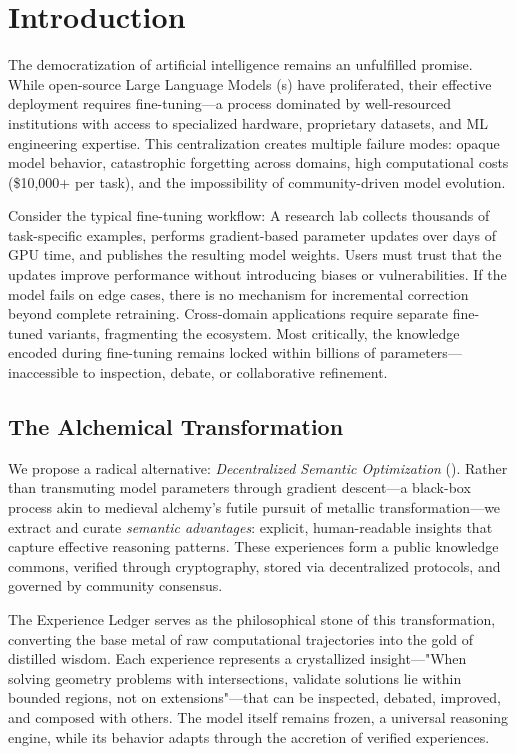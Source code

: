 \section{Introduction}


The democratization of artificial intelligence remains an unfulfilled promise. While open-source Large Language Models (\LLM{}s) have proliferated, their effective deployment requires fine-tuning—a process dominated by well-resourced institutions with access to specialized hardware, proprietary datasets, and ML engineering expertise. This centralization creates multiple failure modes: opaque model behavior, catastrophic forgetting across domains, high computational costs (\$10,000+ per task), and the impossibility of community-driven model evolution.

Consider the typical fine-tuning workflow: A research lab collects thousands of task-specific examples, performs gradient-based parameter updates over days of GPU time, and publishes the resulting model weights. Users must trust that the updates improve performance without introducing biases or vulnerabilities. If the model fails on edge cases, there is no mechanism for incremental correction beyond complete retraining. Cross-domain applications require separate fine-tuned variants, fragmenting the ecosystem. Most critically, the knowledge encoded during fine-tuning remains locked within billions of parameters—inaccessible to inspection, debate, or collaborative refinement.

\subsection{The Alchemical Transformation}

We propose a radical alternative: \textit{Decentralized Semantic Optimization} (\DSO{}). Rather than transmuting model parameters through gradient descent—a black-box process akin to medieval alchemy's futile pursuit of metallic transformation—we extract and curate \textit{semantic advantages}: explicit, human-readable insights that capture effective reasoning patterns. These experiences form a public knowledge commons, verified through cryptography, stored via decentralized protocols, and governed by community consensus.

The Experience Ledger serves as the philosophical stone of this transformation, converting the base metal of raw computational trajectories into the gold of distilled wisdom. Each experience represents a crystallized insight—"When solving geometry problems with intersections, validate solutions lie within bounded regions, not on extensions"—that can be inspected, debated, improved, and composed with others. The model itself remains frozen, a universal reasoning engine, while its behavior adapts through the accretion of verified experiences.

